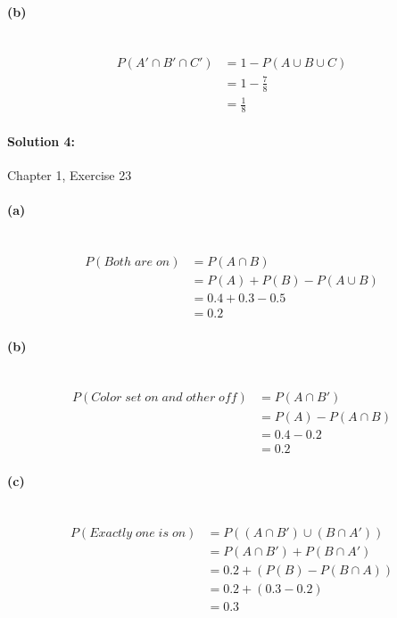 \documentclass[a4paper]{article}
\begin{document}
\paragraph{(b)} ~\\
\begin{align*} 
P(A' \cap B' \cap C') &= 1 - P(A \cup B \cup C) \\
                      &= 1 - \frac{7}{8} \\
                      &= \frac{1}{8}
\end{align*}

\paragraph{Solution 4:}
Chapter 1, Exercise 23

\paragraph{(a)} ~\\
\begin{align*}
P(Both \; are \; on) &= P(A \cap B) \\
               &= P(A) + P(B) - P(A \cup B) \\
               &= 0.4 + 0.3 - 0.5 \\
               &= 0.2
\end{align*}

\paragraph{(b)} ~\\
\begin{align*}
P(Color \; set \; on \; and \; other \; off) &= P(A \cap B') \\
                           &= P(A) - P(A \cap B) \\
                           &= 0.4 - 0.2 \\
                           &= 0.2
\end{align*}

\paragraph{(c)} ~\\
\begin{align*}
P(Exactly \; one \; is \; on) &= P((A \cap B') \cup (B \cap A'))  \\
                    &= P(A \cap B') + P(B \cap A') \\
                    &= 0.2 + (P(B) - P(B \cap A)) \\
                    &= 0.2 + (0.3 - 0.2) \\
                    &= 0.3
\end{align*}
\end{document}
